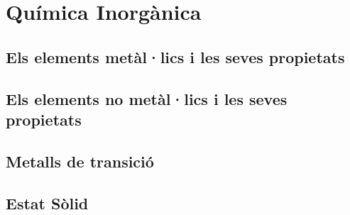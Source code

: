 \chapter{Química Inorgànica}

\section{Els elements metàl·lics i les seves propietats}

\section{Els elements no metàl·lics i les seves propietats}
\section{Metalls de transició}
\section{Estat Sòlid}
